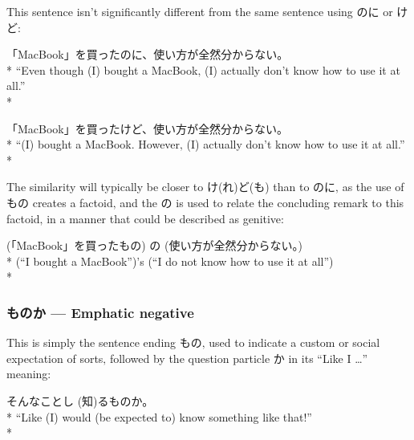 \documentclass[11pt, b5paper, twoside, openright, onecolumn]{book}
\makeatletter
\newcommand*{\rubystack}[2]{{\relscale{0.5}%
  \begin{tabular}[b]{@{}c@{}}%
    {#1}\\%
   {\textscale{2}{#2}}%
  \end{tabular}}%
}
\DeclareRobustCommand*{\ruby}[2]{%
  \mbox{%
    \setlength{\parskip}{0ex}%
    \BeginAccSupp{method=pdfstringdef,ActualText={#1}}%
      \rubystack{\phantom{#2}}{#1}%
      \llap{%
        \rubystack{#2}{\phantom{#1}}%
      }%
    \EndAccSupp{}%
  }%
}
\renewcommand*{\ruby}[2]{#2 (#1)}%
\newenvironment{exampleblock}{
\setlength{\parindent}{0.6in}
\begin{minipage}[t]{\dimexpr\textwidth-\parindent}}
{\end{minipage}}
\makeatother
\begin{document}
This sentence isn’t significantly different from the same sentence using のに or けど:

\vspace{0.4cm}
\begin{exampleblock}
「MacBook」を買ったのに、使い方が全然分からない。 \\* 
“Even though (I) bought a MacBook‚ (I) actually don’t know how to use it at all.” \\* 
\end{exampleblock}
\vspace{0.2cm}

\begin{exampleblock}
「MacBook」を買ったけど、使い方が全然分からない。 \\* 
“(I) bought a MacBook. However‚ (I) actually don’t know how to use it at all.” \\* 
\end{exampleblock}
\vspace{0.2cm}

The similarity will typically be closer to け(れ)ど(も) than to のに‚ as the use of もの creates a factoid‚ and the の is used to relate the concluding remark to this factoid‚ in a manner that could be described as genitive:

\vspace{0.4cm}
\begin{exampleblock}
(「MacBook」を買ったもの) の (使い方が全然分からない。) \\* 
(“I bought a MacBook”)’s (“I do not know how to use it at all”) \\* 
\end{exampleblock}
\subsubsection{ものか — Emphatic negative}


This is simply the sentence ending もの‚ used to indicate a custom or social expectation of sorts‚ followed by the question particle か in its “Like I …” meaning:

\vspace{0.4cm}
\begin{exampleblock}
そんなこと\ruby{知}{し}るものか。 \\* 
“Like (I) would (be expected to) know something like that!” \\* 
\end{exampleblock}
\vspace{0.2cm}
\end{document}
